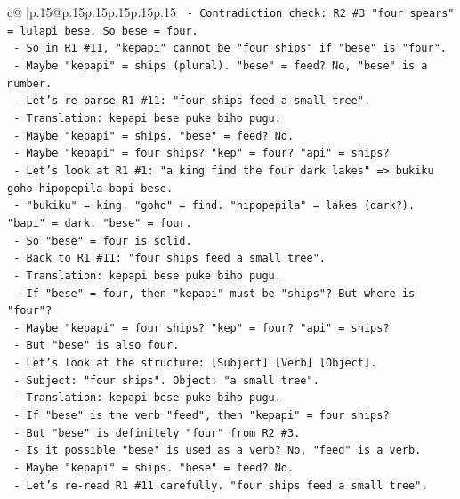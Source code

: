 \documentclass{article}
\begin{document}
{\begin{supertabular}{c@{$\;$}|p{.15\linewidth}@{}p{.15\linewidth}p{.15\linewidth}p{.15\linewidth}p{.15\linewidth}p{.15\linewidth}}
{{{\texttt{    {-} Contradiction check: R2 \#3 "four spears" = lulapi bese. So bese = four.} \\
\texttt{    {-} So in R1 \#11, "kepapi" cannot be "four ships" if "bese" is "four".} \\
\texttt{    {-} Maybe "kepapi" = ships (plural). "bese" = feed? No, "bese" is a number.} \\
\texttt{    {-} Let's re{-}parse R1 \#11: "four ships feed a small tree".} \\
\texttt{    {-} Translation: kepapi bese puke biho pugu.} \\
\texttt{    {-} Maybe "kepapi" = ships. "bese" = feed? No.} \\
\texttt{    {-} Maybe "kepapi" = four ships? "kep" = four? "api" = ships?} \\
\texttt{    {-} Let's look at R1 \#1: "a king find the four dark lakes" => bukiku goho hipopepila bapi bese.} \\
\texttt{      {-} "bukiku" = king. "goho" = find. "hipopepila" = lakes (dark?). "bapi" = dark. "bese" = four.} \\
\texttt{      {-} So "bese" = four is solid.} \\
\texttt{    {-} Back to R1 \#11: "four ships feed a small tree".} \\
\texttt{      {-} Translation: kepapi bese puke biho pugu.} \\
\texttt{      {-} If "bese" = four, then "kepapi" must be "ships"? But where is "four"?} \\
\texttt{      {-} Maybe "kepapi" = four ships? "kep" = four? "api" = ships?} \\
\texttt{      {-} But "bese" is also four.} \\
\texttt{      {-} Let's look at the structure: {[}Subject{]} {[}Verb{]} {[}Object{]}.} \\
\texttt{      {-} Subject: "four ships". Object: "a small tree".} \\
\texttt{      {-} Translation: kepapi bese puke biho pugu.} \\
\texttt{      {-} If "bese" is the verb "feed", then "kepapi" = four ships?} \\
\texttt{      {-} But "bese" is definitely "four" from R2 \#3.} \\
\texttt{      {-} Is it possible "bese" is used as a verb? No, "feed" is a verb.} \\
\texttt{      {-} Maybe "kepapi" = ships. "bese" = feed? No.} \\
\texttt{      {-} Let's re{-}read R1 \#11 carefully. "four ships feed a small tree".} \\
}}}
\end{supertabular}}
\end{document}
